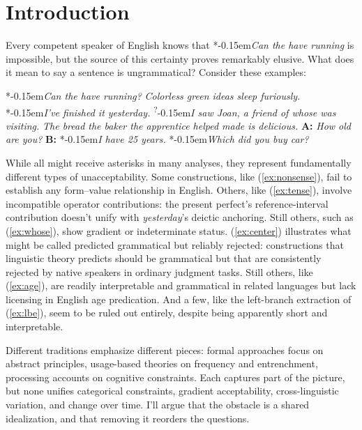 \documentclass[12pt,letterpaper]{article}
\newcommand{\mention}[1]{\textit{#1}}
\newcommand{\judgesep}{\kern-0.15em}
\newcommand{\ungram}[1]{*\judgesep#1}
\newcommand{\marg}[1]{\textsuperscript{?}\judgesep#1}
\begin{document}

\newpage
\section*{Introduction}

Every competent speaker of English knows that \ungram{\mention{Can the have running}} is impossible, but the source of this certainty proves remarkably elusive. What does it mean to say a sentence is ungrammatical? Consider these examples:

\ea \label{ex:starting-stars}
\ea\label{ex:nonsense} \ungram{\mention{Can the have running?}}
\ex\label{ex:colorless-grammatica} \mention{Colorless green ideas sleep furiously.} \autocite{chomsky1957}
\ex\label{ex:tense} \ungram{\mention{I've finished it yesterday.}}
\ex\marg{\mention{I saw Joan, a friend of whose was visiting.}}\label{ex:whose} 
\ex\label{ex:center} \mention{The bread the baker the apprentice helped made is delicious.}
\ex\label{ex:age} \textbf{A:} \mention{How old are you?} \textbf{B:} \ungram{\mention{I have 25 years.}}
\ex\label{ex:lbe} \ungram{\mention{Which did you buy car?}}
\z\z

While all might receive asterisks in many analyses, they represent fundamentally different types of unacceptability. Some constructions, like (\ref{ex:nonsense}), fail to establish any form--value relationship in English. Others, like (\ref{ex:tense}), involve incompatible operator contributions: the present perfect's reference-interval contribution doesn't unify with \mention{yesterday}'s deictic anchoring. Still others, such as (\ref{ex:whose}), show gradient or indeterminate status. (\ref{ex:center}) illustrates what might be called predicted grammatical but reliably rejected: constructions that linguistic theory predicts should be grammatical but that are consistently rejected by native speakers in ordinary judgment tasks. Still others, like (\ref{ex:age}), are readily interpretable and grammatical in related languages but lack licensing in English age predication. And a few, like the left-branch extraction of (\ref{ex:lbe}), seem to be ruled out entirely, despite being apparently short and interpretable.

Different traditions emphasize different pieces: formal approaches focus on abstract principles, usage-based theories on frequency and entrenchment, processing accounts on cognitive constraints. Each captures part of the picture, but none unifies categorical constraints, gradient acceptability, cross-linguistic variation, and change over time. I'll argue that the obstacle is a shared idealization, and that removing it reorders the questions.
\end{document}
